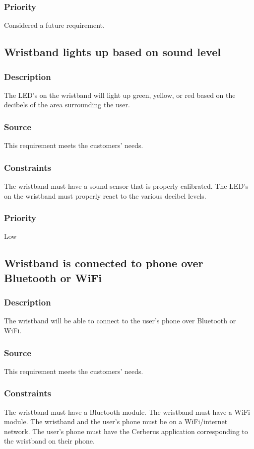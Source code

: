 \subsubsection{Priority}
Considered a future requirement.

\subsection{Wristband lights up based on sound level}
\subsubsection{Description}
The LED's on the wristband will light up green, yellow, or red based on the decibels of the area surrounding the user.
\subsubsection{Source}
This requirement meets the customers' needs.
\subsubsection{Constraints}
The wristband must have a sound sensor that is properly calibrated. The LED's on the wristband must properly react to the various decibel levels.
\subsubsection{Priority}
Low

\subsection{Wristband is connected to phone over Bluetooth or WiFi}
\subsubsection{Description}
The wristband will be able to connect to the user's phone over Bluetooth or WiFi.
\subsubsection{Source}
This requirement meets the customers' needs.
\subsubsection{Constraints}
The wristband must have a Bluetooth module. The wristband must have a WiFi module. The wristband and the user's phone must be on a WiFi/internet network. The user's phone must have the Cerberus application corresponding to the wristband on their phone. 
